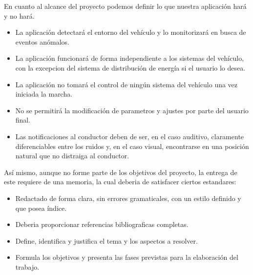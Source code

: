 En cuanto al alcance del proyecto podemos definir lo que nuestra aplicación hará y no hará.

\begin{itemize}
    \item La aplicación detectará el entorno del vehículo y lo monitorizará en busca de eventos anómalos.
    \item La aplicación funcionará de forma independiente a los sistemas del vehículo, con la excepcion del sistema de distribución de energía si el usuario lo desea.
    \item La aplicación no tomará el control de ningún sistema del vehículo una vez iniciada la marcha.
    \item No se permitirá la modificación de parametros y ajustes por parte del usuario final.
    \item Las notificaciones al conductor deben de ser, en el caso auditivo, claramente diferenciables entre los ruidos y, en el caso visual, encontrarse en una posición natural que no distraiga al conductor.
\end{itemize}

Así mismo, aunque no forme parte de los objetivos del proyecto, la entrega de este requiere de una memoria, la cual deberia de satisfacer ciertos estandares:
\begin{itemize}
    \item Redactado de forma clara, sin errores gramaticales, con un estilo definido y que posea índice.
    \item Deberia proporcionar referencias bibliograficas completas.
    \item Define, identifica y justifica el tema y los aspectos a resolver.
    \item Formula los objetivos y presenta las fases previstas para la elaboración del trabajo.
\end{itemize}
